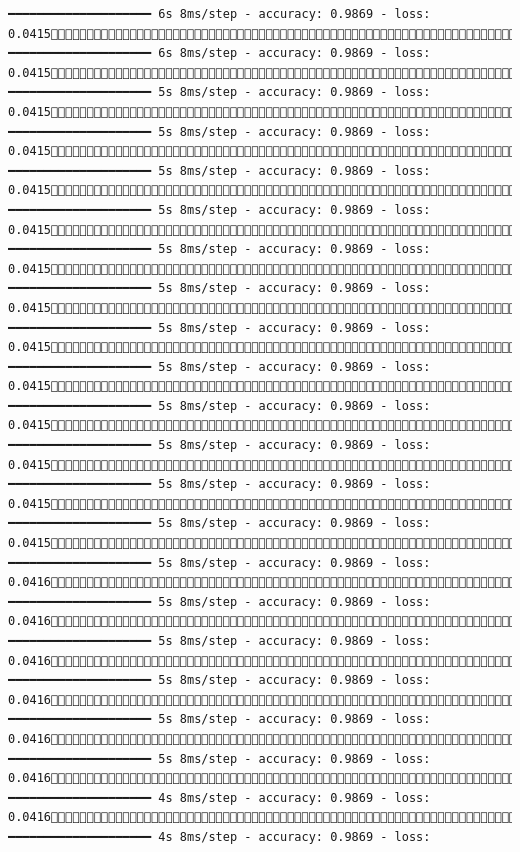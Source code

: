 \documentclass[
  letterpaper,
  DIV=11,
  numbers=noendperiod]{scrreprt}
\begin{document}
\begin{verbatim}
━━━━━━━━━━━━━━━━━━━━ 6s 8ms/step - accuracy: 0.9869 - loss: 0.04151080/1875 ━━━━━━━━━━━━━━━━━━━━ 6s 8ms/step - accuracy: 0.9869 - loss: 0.04151087/1875 ━━━━━━━━━━━━━━━━━━━━ 5s 8ms/step - accuracy: 0.9869 - loss: 0.04151094/1875 ━━━━━━━━━━━━━━━━━━━━ 5s 8ms/step - accuracy: 0.9869 - loss: 0.04151102/1875 ━━━━━━━━━━━━━━━━━━━━ 5s 8ms/step - accuracy: 0.9869 - loss: 0.04151109/1875 ━━━━━━━━━━━━━━━━━━━━ 5s 8ms/step - accuracy: 0.9869 - loss: 0.04151116/1875 ━━━━━━━━━━━━━━━━━━━━ 5s 8ms/step - accuracy: 0.9869 - loss: 0.04151123/1875 ━━━━━━━━━━━━━━━━━━━━ 5s 8ms/step - accuracy: 0.9869 - loss: 0.04151130/1875 ━━━━━━━━━━━━━━━━━━━━ 5s 8ms/step - accuracy: 0.9869 - loss: 0.04151137/1875 ━━━━━━━━━━━━━━━━━━━━ 5s 8ms/step - accuracy: 0.9869 - loss: 0.04151144/1875 ━━━━━━━━━━━━━━━━━━━━ 5s 8ms/step - accuracy: 0.9869 - loss: 0.04151151/1875 ━━━━━━━━━━━━━━━━━━━━ 5s 8ms/step - accuracy: 0.9869 - loss: 0.04151158/1875 ━━━━━━━━━━━━━━━━━━━━ 5s 8ms/step - accuracy: 0.9869 - loss: 0.04151166/1875 ━━━━━━━━━━━━━━━━━━━━ 5s 8ms/step - accuracy: 0.9869 - loss: 0.04151174/1875 ━━━━━━━━━━━━━━━━━━━━ 5s 8ms/step - accuracy: 0.9869 - loss: 0.04161181/1875 ━━━━━━━━━━━━━━━━━━━━ 5s 8ms/step - accuracy: 0.9869 - loss: 0.04161189/1875 ━━━━━━━━━━━━━━━━━━━━ 5s 8ms/step - accuracy: 0.9869 - loss: 0.04161196/1875 ━━━━━━━━━━━━━━━━━━━━ 5s 8ms/step - accuracy: 0.9869 - loss: 0.04161203/1875 ━━━━━━━━━━━━━━━━━━━━ 5s 8ms/step - accuracy: 0.9869 - loss: 0.04161210/1875 ━━━━━━━━━━━━━━━━━━━━ 5s 8ms/step - accuracy: 0.9869 - loss: 0.04161217/1875 ━━━━━━━━━━━━━━━━━━━━ 4s 8ms/step - accuracy: 0.9869 - loss: 0.04161224/1875 ━━━━━━━━━━━━━━━━━━━━ 4s 8ms/step - accuracy: 0.9869 - loss: 
\end{verbatim}
\end{document}
